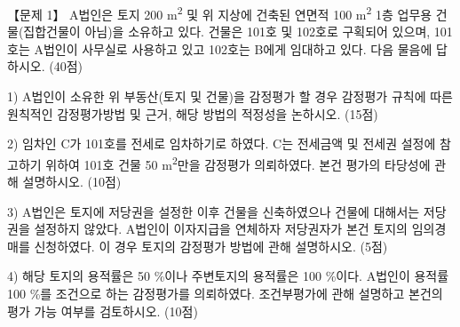 \begin{longquestion}{【문제 1】}
A법인은 토지 200 m\textsuperscript{2} 및 위 지상에 건축된 연면적 100 m\textsuperscript{2} 1층 업무용 건물(집합건물이 아님)을 소유하고 있다. 건물은 101호 및 102호로 구획되어 있으며, 101호는 A법인이 사무실로 사용하고 있고 102호는 B에게 임대하고 있다. 다음 물음에 답하시오. (40점) \par
1) A법인이 소유한 위 부동산(토지 및 건물)을 감정평가 할 경우 감정평가 규칙에 따른 원칙적인 감정평가방법 및 근거, 해당 방법의 적정성을 논하시오. (15점) \par
2) 임차인 C가 101호를 전세로 임차하기로 하였다. C는 전세금액 및 전세권 설정에 참고하기 위하여 101호 건물 50 m\textsuperscript{2}만을 감정평가 의뢰하였다. 본건 평가의 타당성에 관해 설명하시오. (10점) \par
3) A법인은 토지에 저당권을 설정한 이후 건물을 신축하였으나 건물에 대해서는 저당권을 설정하지 않았다. A법인이 이자지급을 연체하자 저당권자가 본건 토지의 임의경매를 신청하였다. 이 경우 토지의 감정평가 방법에 관해 설명하시오. (5점) \par
4) 해당 토지의 용적률은 50 \%이나 주변토지의 용적률은 100 \%이다. A법인이 용적률 100 \%를 조건으로 하는 감정평가를 의뢰하였다. 조건부평가에 관해 설명하고 본건의 평가 가능 여부를 검토하시오. (10점) \par
\end{longquestion}
